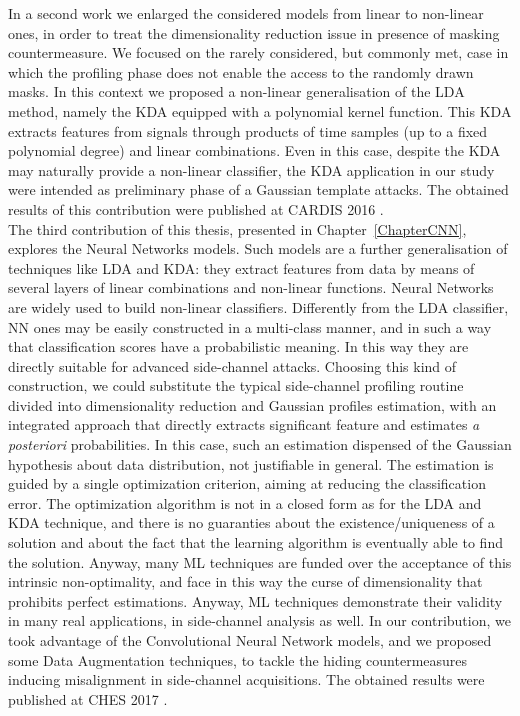 In a second work we enlarged the considered models from linear to non-linear ones, in order to treat the dimensionality reduction issue in presence of masking countermeasure. We focused on the rarely considered, but commonly met, case in which the profiling phase does not enable the access to the randomly drawn masks. In this context we proposed a non-linear generalisation  of the LDA method, namely the KDA equipped with a polynomial kernel function. This KDA extracts features from signals through products of time samples (up to a fixed polynomial degree) and linear combinations. Even in this case, despite the KDA may naturally provide a non-linear classifier, the KDA application in our study were intended as preliminary phase of a Gaussian template attacks. The obtained results of this contribution were published at CARDIS 2016 \cite{cagli2016kernel}.\\


 The third contribution of this thesis, presented in Chapter~\ref{ChapterCNN}, explores the Neural Networks models. Such models are a further generalisation of techniques like LDA and KDA: they extract features from data by means of several layers of linear combinations and non-linear functions. Neural Networks are widely used to build non-linear classifiers. Differently from the LDA classifier, NN ones may be easily constructed in a multi-class manner, and in such a way that classification scores have a probabilistic meaning. In this way they are directly suitable for advanced side-channel attacks. Choosing this kind of construction, we could substitute the typical side-channel profiling routine divided into dimensionality reduction and Gaussian profiles estimation, with an integrated approach that directly extracts significant feature and estimates \textit{a posteriori} probabilities. In this case, such an estimation dispensed of the Gaussian hypothesis about data distribution, not justifiable in general. The estimation is guided by a single optimization criterion, aiming at reducing the classification error. The optimization algorithm is not in a closed form as for the LDA and KDA technique, and there is no guaranties about the existence/uniqueness of a solution and about the fact that the learning algorithm is eventually able to find the solution. Anyway, many ML techniques are funded over the acceptance of this intrinsic non-optimality, and face in this way the curse of dimensionality that prohibits perfect estimations. Anyway, ML techniques demonstrate their validity in many real applications, in side-channel analysis as well. In our contribution, we took advantage of the Convolutional Neural Network models, and we proposed some Data Augmentation techniques, to tackle the hiding countermeasures inducing misalignment in side-channel acquisitions. The obtained results were published at CHES 2017 \cite{DBLP:conf/ches/CagliDP17}.\\
 





